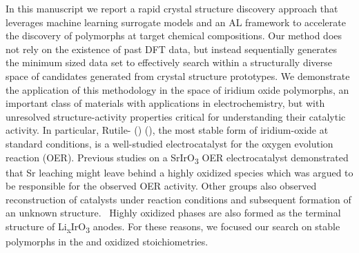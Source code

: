 %
In this manuscript we report a rapid crystal structure discovery approach that leverages machine learning surrogate models and an AL framework to accelerate the discovery of polymorphs at target chemical compositions.
%
Our method does not rely on the existence of past DFT data,
but instead sequentially generates the minimum sized data set to effectively search within a structurally diverse space of candidates generated from crystal structure prototypes.
%
We demonstrate the application of this methodology in the space of iridium oxide polymorphs,
an important class of materials with applications in electrochemistry,
but with unresolved structure-activity properties critical for understanding their catalytic activity.
%
In particular, Rutile- (\rIrOtwo) (), the most stable form of iridium-oxide at standard conditions,
is a well-studied electrocatalyst for the oxygen evolution reaction (OER).
\cite{Seitz2016,Lee2012a,McCrory2015,Trotochaud2012,Danilovic2014,Carmo2013,Miles1978,Beni1979}
%
Previous studies on a SrIrO\textsubscript{3} OER electrocatalyst demonstrated that Sr leaching might leave behind a highly oxidized  species which was argued to be responsible for the observed OER activity.
\cite{Seitz2016}
%
Other groups also observed reconstruction of \IrOx catalysts under reaction conditions and subsequent formation of an unknown structure.~\cite{Pearce2017}
%
Highly oxidized \IrOthree phases are also formed as the terminal structure of Li\textsubscript{x}IrO\textsubscript{3} anodes.\cite{Pearce2017}
%
For these reasons, we focused our search on stable polymorphs in the \IrOtwo and oxidized \IrOthree stoichiometries.


